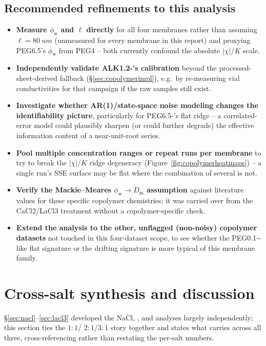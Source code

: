 \documentclass[11pt]{article}
\begin{document}
\subsection{Recommended refinements to this analysis}\label{sec:copolymerrefine}
\begin{itemize}
  \item \textbf{Measure $\phi_{\mathrm w}$ and $\ell$ directly} for all four
  membranes rather than assuming $\ell=\SI{80}{nm}$ (unmeasured for every
  membrane in this report) and proxying PEG6.5's $\phi_{\mathrm w}$ from
  PEG4 -- both currently confound the absolute $|\chi|$/$K$ scale.
  \item \textbf{Independently validate ALK1.2-'s calibration}
  beyond the processed-sheet-derived fallback (\S\ref{sec:copolymerimpl}),
  e.g.\ by re-measuring vial conductivities for that campaign if the raw
  samples still exist.
  \item \textbf{Investigate whether AR(1)/state-space noise modeling changes
  the identifiability picture}, particularly for PEG6.5-'s flat
  ridge -- a correlated-error model could plausibly sharpen (or could
  further degrade) the effective information content of a near-unit-root
  series.
  \item \textbf{Pool multiple concentration ranges or repeat runs per
  membrane} to try to break the $|\chi|$/$K$ ridge degeneracy
  (Figure~\ref{fig:copolymerheatmaps}) -- a single run's SSE surface may be
  flat where the combination of several is not.
  \item \textbf{Verify the Mackie--Meares $\phi_{\mathrm w}\to D_{\mathrm m}$
  assumption} against literature values for these specific copolymer
  chemistries; it was carried over from the CaCl2/LaCl3 treatment without a
  copolymer-specific check.
  \item \textbf{Extend the analysis to the other, unflagged (non-noisy)
  copolymer datasets} not touched in this four-dataset scope, to see whether
  the PEG0.1--like flat signature or the drifting signature is
  more typical of this membrane family.
\end{itemize}

\section{Cross-salt synthesis and discussion}\label{sec:synthesis}
\S\ref{sec:nacl}--\ref{sec:lacl3} developed the NaCl, , and
 analyses largely independently; this section ties the $1{:}1$/
$2{:}1$/$3{:}1$ story together and states what carries across all three,
cross-referencing rather than restating the per-salt numbers.
\end{document}
